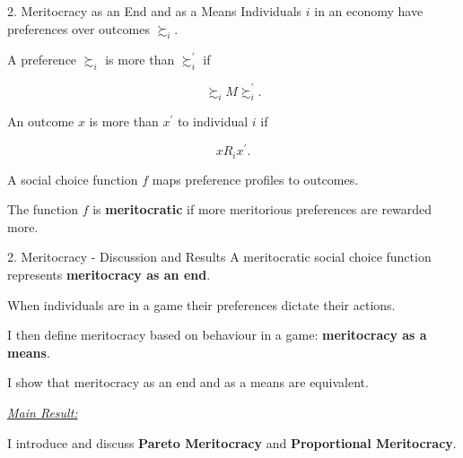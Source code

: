 \documentclass[usenames,dvipsnames,aspectratio=169,11pt,handout]{beamer}
\begin{document}
\begin{frame}{2. Meritocracy as an End and as a Means}
	Individuals \( i \) in an economy have preferences over outcomes \( \succsim_i \). \pause

	\vfill

	A preference \( \succsim_i \) is more  than \( \succsim_i^{\prime} \) if

	\[ \succsim_i M \succsim_i^{\prime} . \] \pause

	An outcome \( x \) is more  than \( x^{\prime} \) to individual \( i \) if

	\[ x R_i x^{\prime} .\] \pause

	A social choice function \( f \) maps preference profiles to outcomes. \pause

	\vfill

	The function \( f \) is \textbf{meritocratic} if more meritorious preferences are rewarded more.

\end{frame}

\begin{frame}{2. Meritocracy - Discussion and Results}
	A meritocratic social choice function represents \textbf{meritocracy as an end}.

	\vfill

	When individuals are in a game their preferences dictate their actions.

	\vfill

	I then define meritocracy based on behaviour in a game: \textbf{meritocracy as a means}.

	\vfill

	I show that meritocracy as an end and as a means are equivalent.
	\vfill

	\underline{\textit{Main Result:}}

	I introduce and discuss \textbf{Pareto Meritocracy} and \textbf{Proportional Meritocracy}.

\end{frame}
\end{document}
